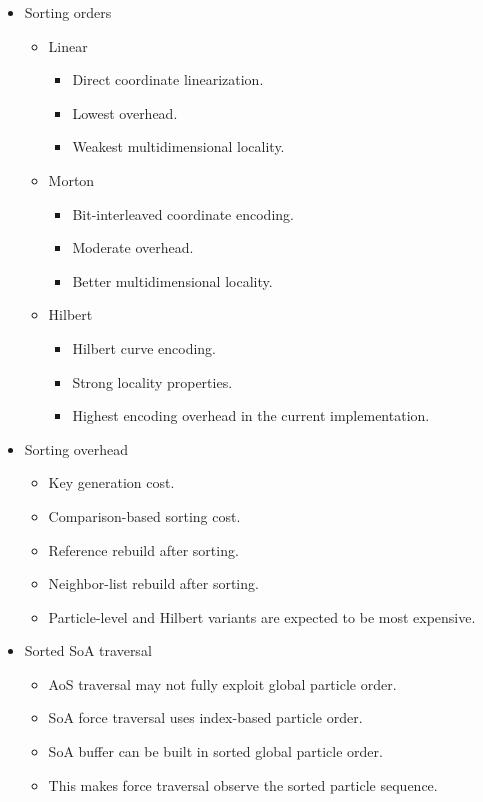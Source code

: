 \begin{itemize}
    \item Sorting orders
    \begin{itemize}
        \item Linear
        \begin{itemize}
            \item Direct coordinate linearization.
            \item Lowest overhead.
            \item Weakest multidimensional locality.
        \end{itemize}
        \item Morton
        \begin{itemize}
            \item Bit-interleaved coordinate encoding.
            \item Moderate overhead.
            \item Better multidimensional locality.
        \end{itemize}
        \item Hilbert
        \begin{itemize}
            \item Hilbert curve encoding.
            \item Strong locality properties.
            \item Highest encoding overhead in the current implementation.
        \end{itemize}
    \end{itemize}

    \item Sorting overhead
    \begin{itemize}
        \item Key generation cost.
        \item Comparison-based sorting cost.
        \item Reference rebuild after sorting.
        \item Neighbor-list rebuild after sorting.
        \item Particle-level and Hilbert variants are expected to be most expensive.
    \end{itemize}

    \item Sorted SoA traversal
    \begin{itemize}
        \item AoS traversal may not fully exploit global particle order.
        \item SoA force traversal uses index-based particle order.
        \item SoA buffer can be built in sorted global particle order.
        \item This makes force traversal observe the sorted particle sequence.
    \end{itemize}


\end{itemize}
